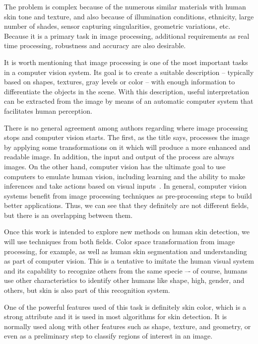 The problem is complex because of the numerous similar materials with human skin tone and texture, and also because of illumination conditions, ethnicity, large number of shades, sensor capturing singularities, geometric variations, etc. Because it is a primary task in image processing, additional requirements as real time processing, robustness and accuracy are also desirable.

It is worth mentioning that image processing is one of the most important tasks in a computer vision system. Its goal is to create a suitable description -- typically based on shapes, textures, gray levels or color -- with enough information to differentiate the objects in the scene. With this description, useful interpretation can be extracted from the image by means of an automatic computer system that facilitates human perception.

There is no general agreement among authors regarding where image processing stops and computer vision starts. The first, as the title says, processes the image by applying some transformations on it which will produce a more enhanced and readable image. In addition, the input and output of the process are always images. On the other hand, computer vision has the ultimate goal to use computers to emulate human vision, including learning and the ability to make inferences and take actions based on visual inputs~\citep{gonzalez:02}. In general,
computer vision systems benefit from image processing techniques as pre-processing steps to build better applications. Thus, we can see that they definitely are not different fields, but there is an overlapping between them.

Once this work is intended to explore new methods on human skin detection, we will use techniques from both fields. Color space transformation from image processing, for example, as well as human skin segmentation and understanding as part of computer vision. This is a tentative to imitate the human visual system and its capability to recognize others from the same specie –- of course, humans use other characteristics to identify other humans like shape, high, gender, and others, but skin is also part of this recognition system.

One of the powerful features used of this task is definitely skin color, which is a strong attribute and it is used in most algorithms for skin detection. It is normally used along with other features such as shape, texture, and geometry, or even as a preliminary step to classify regions of interest in an image.

